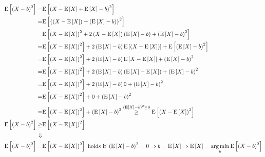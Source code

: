 \documentclass[
]{book}
\theoremstyle{definition}
\theoremstyle{definition}
\theoremstyle{definition}
\theoremstyle{definition}
\theoremstyle{remark}
\begin{document}
\[
\begin{aligned}
\mathrm{E}\left[\left(X-b\right)^{2}\right]= & \mathrm{E}\left[\left(X-\mathrm{E}\left[X\right]+\mathrm{E}\left[X\right]-b\right)^{2}\right]\\
= & \mathrm{E}\left[\left\{ \left(X-\mathrm{E}\left[X\right]\right)+\left(\mathrm{E}\left[X\right]-b\right)\right\} ^{2}\right]\\
= & \mathrm{E}\left[\left(X-\mathrm{E}\left[X\right]\right)^{2}+2\left(X-\mathrm{E}\left[X\right]\right)\left(\mathrm{E}\left[X\right]-b\right)+\left(\mathrm{E}\left[X\right]-b\right)^{2}\right]\\
= & \mathrm{E}\left[\left(X-\mathrm{E}\left[X\right]\right)^{2}\right]+2\left(\mathrm{E}\left[X\right]-b\right)\mathrm{E}\left[\left(X-\mathrm{E}\left[X\right]\right)\right]+\mathrm{E}\left[\left(\mathrm{E}\left[X\right]-b\right)^{2}\right]\\
= & \mathrm{E}\left[\left(X-\mathrm{E}\left[X\right]\right)^{2}\right]+2\left(\mathrm{E}\left[X\right]-b\right)\mathrm{E}\left[X-\mathrm{E}\left[X\right]\right]+\left(\mathrm{E}\left[X\right]-b\right)^{2}\\
= & \mathrm{E}\left[\left(X-\mathrm{E}\left[X\right]\right)^{2}\right]+2\left(\mathrm{E}\left[X\right]-b\right)\left(\mathrm{E}\left[X\right]-\mathrm{E}\left[X\right]\right)+\left(\mathrm{E}\left[X\right]-b\right)^{2}\\
= & \mathrm{E}\left[\left(X-\mathrm{E}\left[X\right]\right)^{2}\right]+2\left(\mathrm{E}\left[X\right]-b\right)0+\left(\mathrm{E}\left[X\right]-b\right)^{2}\\
= & \mathrm{E}\left[\left(X-\mathrm{E}\left[X\right]\right)^{2}\right]+0+\left(\mathrm{E}\left[X\right]-b\right)^{2}\\
= & \mathrm{E}\left[\left(X-\mathrm{E}\left[X\right]\right)^{2}\right]+\left(\mathrm{E}\left[X\right]-b\right)^{2}\overset{\left(\mathrm{E}\left[X\right]-b\right)^{2}\ge0}{\ge}\mathrm{E}\left[\left(X-\mathrm{E}\left[X\right]\right)^{2}\right]\\
\mathrm{E}\left[\left(X-b\right)^{2}\right]\ge & \mathrm{E}\left[\left(X-\mathrm{E}\left[X\right]\right)^{2}\right]\\
\Downarrow\\
\mathrm{E}\left[\left(X-b\right)^{2}\right]= & \mathrm{E}\left[\left(X-\mathrm{E}\left[X\right]\right)^{2}\right]\text{ holds if }\left(\mathrm{E}\left[X\right]-b\right)^{2}=0\Rightarrow b=\mathrm{E}\left[X\right]\Rightarrow\mathrm{E}\left[X\right]=\underset{b}{\arg\min}\thinspace\mathrm{E}\left[\left(X-b\right)^{2}\right]
\end{aligned}
\]
\end{document}
